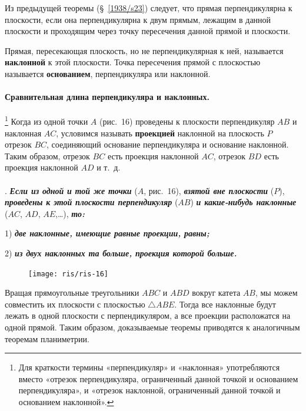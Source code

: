 \documentclass[twoside]{book}
\begin{document}
Из предыдущей теоремы (§~\ref{1938/s23}) следует, что прямая перпендикулярна к плоскости, если она перпендикулярна к двум прямым, лежащим в данной плоскости и проходящим через точку пересечения данной прямой и плоскости.

Прямая, пересекающая плоскость, но не перпендикулярная к ней, называется \textbf{наклонной} к этой плоскости.
Точка пересечения прямой с плоскостью называется \textbf{основанием}, перпендикуляра или наклонной.


\paragraph{Сравнительная длина перпендикуляра и наклонных.}\label{1938/s25}%
\footnote{Для краткости термины «перпендикуляр» и «наклонная» употребляются вместо «отрезок перпендикуляра, ограниченный данной точкой и основанием перпендикуляра», и «отрезок наклонной, ограниченный данной точкой и основанием наклонной».}
Когда из одной точки $A$ (рис.~16) проведены к плоскости перпендикуляр $AB$ и наклонная $AC$, условимся называть \textbf{проекцией} наклонной на плоскость $P$ отрезок $BC$, соединяющий основание перпендикуляра и основание наклонной.
Таким образом, отрезок $BC$ есть проекция наклонной $AC$, отрезок $BD$ есть проекция наклонной $AD$ и т.~д.

\paragraph{}\label{1938/s26}
.
\textbf{\emph{Если из одной и той же точки}} ($A$, рис.~16), \textbf{\emph{взятой вне плоскости}} ($P$), \textbf{\emph{проведены к этой плоскости перпендикуляр}} ($AB$) \textbf{\emph{и какие-нибудь наклонные}} ($AC$, $AD$, $AE$,\dots), \textbf{\emph{то:}}

1) \textbf{\emph{две наклонные, имеющие равные проекции, равны;}}

2) \textbf{\emph{из двух наклонных та больше, проекция которой больше.}} 

\begin{figure}[h!]
\centering
\texttt{[image: ris/ris-16]}
\caption{}
\end{figure}

Вращая прямоугольные треугольники $ABC$ и $ABD$ вокруг катета $AB$, мы можем совместить их плоскости с плоскостью $\triangle ABE$.
Тогда все наклонные будут лежать в одной плоскости с перпендикуляром, а все проекции расположатся на одной прямой.
Таким образом, доказываемые теоремы приводятся к аналогичным теоремам планиметрии.
\end{document}
